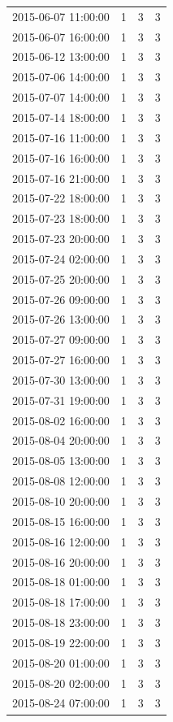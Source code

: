 \begin{tabular}{lrrr}
2015-06-07 11:00:00 & 1 & 3 & 3 \\
2015-06-07 16:00:00 & 1 & 3 & 3 \\
2015-06-12 13:00:00 & 1 & 3 & 3 \\
2015-07-06 14:00:00 & 1 & 3 & 3 \\
2015-07-07 14:00:00 & 1 & 3 & 3 \\
2015-07-14 18:00:00 & 1 & 3 & 3 \\
2015-07-16 11:00:00 & 1 & 3 & 3 \\
2015-07-16 16:00:00 & 1 & 3 & 3 \\
2015-07-16 21:00:00 & 1 & 3 & 3 \\
2015-07-22 18:00:00 & 1 & 3 & 3 \\
2015-07-23 18:00:00 & 1 & 3 & 3 \\
2015-07-23 20:00:00 & 1 & 3 & 3 \\
2015-07-24 02:00:00 & 1 & 3 & 3 \\
2015-07-25 20:00:00 & 1 & 3 & 3 \\
2015-07-26 09:00:00 & 1 & 3 & 3 \\
2015-07-26 13:00:00 & 1 & 3 & 3 \\
2015-07-27 09:00:00 & 1 & 3 & 3 \\
2015-07-27 16:00:00 & 1 & 3 & 3 \\
2015-07-30 13:00:00 & 1 & 3 & 3 \\
2015-07-31 19:00:00 & 1 & 3 & 3 \\
2015-08-02 16:00:00 & 1 & 3 & 3 \\
2015-08-04 20:00:00 & 1 & 3 & 3 \\
2015-08-05 13:00:00 & 1 & 3 & 3 \\
2015-08-08 12:00:00 & 1 & 3 & 3 \\
2015-08-10 20:00:00 & 1 & 3 & 3 \\
2015-08-15 16:00:00 & 1 & 3 & 3 \\
2015-08-16 12:00:00 & 1 & 3 & 3 \\
2015-08-16 20:00:00 & 1 & 3 & 3 \\
2015-08-18 01:00:00 & 1 & 3 & 3 \\
2015-08-18 17:00:00 & 1 & 3 & 3 \\
2015-08-18 23:00:00 & 1 & 3 & 3 \\
2015-08-19 22:00:00 & 1 & 3 & 3 \\
2015-08-20 01:00:00 & 1 & 3 & 3 \\
2015-08-20 02:00:00 & 1 & 3 & 3 \\
2015-08-24 07:00:00 & 1 & 3 & 3 \\

\end{tabular}
